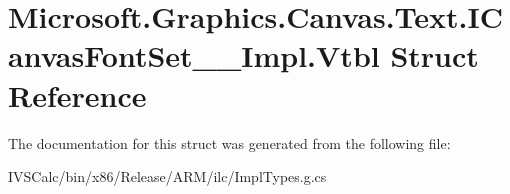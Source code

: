 \hypertarget{struct_microsoft_1_1_graphics_1_1_canvas_1_1_text_1_1_i_canvas_font_set_____impl_1_1_vtbl}{}\section{Microsoft.\+Graphics.\+Canvas.\+Text.\+I\+Canvas\+Font\+Set\+\_\+\+\_\+\+Impl.\+Vtbl Struct Reference}
\label{struct_microsoft_1_1_graphics_1_1_canvas_1_1_text_1_1_i_canvas_font_set_____impl_1_1_vtbl}


The documentation for this struct was generated from the following file\+:\begin{DoxyCompactItemize}
\item 
I\+V\+S\+Calc/bin/x86/\+Release/\+A\+R\+M/ilc/Impl\+Types.\+g.\+cs\end{DoxyCompactItemize}

